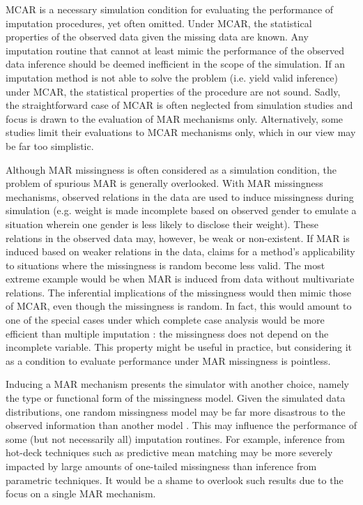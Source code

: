 \documentclass[bimj,fleqn]{w-art}
\begin{document}


MCAR is a necessary simulation condition for evaluating the performance of imputation procedures, yet often omitted. Under MCAR, the statistical properties of the observed data given the missing data are known. Any imputation routine that cannot at least mimic the performance of the observed data inference should be deemed inefficient in the scope of the simulation. If an imputation method is not able to solve the problem (i.e. yield valid inference) under MCAR, the statistical properties of the procedure are not sound. Sadly, the straightforward case of MCAR is often neglected from simulation studies and focus is drawn to the evaluation of MAR mechanisms only. Alternatively, some studies limit their evaluations to MCAR mechanisms only, which in our view may be far too simplistic. 

Although MAR missingness is often considered as a simulation condition, the problem of spurious MAR is generally overlooked. With MAR missingness mechanisms, observed relations in the data are used to induce missingness during simulation (e.g. weight is made incomplete based on observed gender to emulate a situation wherein one gender is less likely to disclose their weight). These relations in the observed data may, however, be weak or non-existent. If MAR is induced based on weaker relations in the data, claims for a method's applicability to situations where the missingness is random become less valid. The most extreme example would be when MAR is induced from data without multivariate relations. The inferential implications of the missingness would then mimic those of MCAR, even though the missingness is random. In fact, this would amount to one of the special cases under which complete case analysis would be more efficient than multiple imputation \citep[see e.g.][\S 2.7]{buur18}: the missingness does not depend on the incomplete variable. This property might be useful in practice, but considering it as a condition to evaluate performance under MAR missingness is pointless. 

Inducing a MAR mechanism presents the simulator with another choice, namely the type or functional form of the missingness model. Given the simulated data distributions, one random missingness model may be far more disastrous to the observed information than another model \citep{scho18}. This may influence the performance of some (but not necessarily all) imputation routines. For example, inference from hot-deck techniques such as predictive mean matching \citep{little1988missing, rubin1986statistical} may be more severely impacted by large amounts of one-tailed missingness than inference from parametric techniques. It would be a shame to overlook such results due to the focus on a single MAR mechanism.
\end{document}
